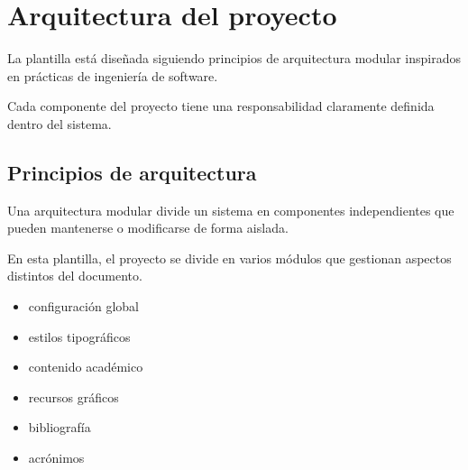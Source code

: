 %
%
%
%
%
%
%
%


\chapter{Arquitectura del proyecto}

La plantilla está diseñada siguiendo principios de
arquitectura modular inspirados en prácticas de
ingeniería de software.

Cada componente del proyecto tiene una responsabilidad
claramente definida dentro del sistema.




\section{Principios de arquitectura}

\begin{definitionbox}
Una arquitectura modular divide un sistema en componentes
independientes que pueden mantenerse o modificarse de
forma aislada.
\end{definitionbox}

En esta plantilla, el proyecto se divide en varios módulos
que gestionan aspectos distintos del documento.



\begin{itemize}

\item configuración global
\item estilos tipográficos
\item contenido académico
\item recursos gráficos
\item bibliografía
\item acrónimos

\end{itemize}



